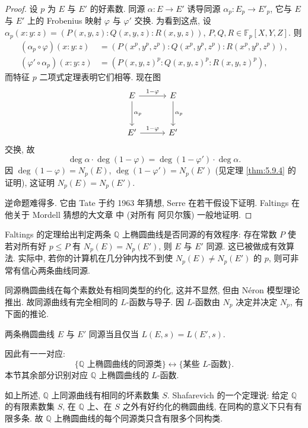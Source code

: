 \begin{proof}
设 $p$ 为 $E$ 与 $E'$ 的好素数. 同源 $\alpha\colon E\to E'$ 诱导同源 $\alpha_p\colon E_p\to E'_p$, 它与 $E$ 与 $E'$ 上的 Frobenius 映射 $\varphi$ 与 $\varphi'$ 交换. 为看到这点, 设 $\alpha_p(x:y:z) = (P(x,y,z):Q(x,y,z):R(x,y,z))$, $P, Q, R\in\mathbb{F}_p[X, Y, Z]$. 则
\begin{align*}
(\alpha_p\circ\varphi)(x:y:z) &= (P(x^p, y^p, z^p):Q(x^p, y^p, z^p):R(x^p, y^p, z^p)),\\
(\varphi'\circ\alpha_p)(x:y:z) &= (P(x,y,z)^p:Q(x,y,z)^p:R(x,y,z)^p),
\end{align*}
而特征 $p$ 二项式定理表明它们相等. 现在图
\[
\begin{tikzcd}[row sep=3em, column sep=3em]
    E \arrow[r, "1-\varphi"] \arrow[d, "\alpha_p"] & E \arrow[d, "\alpha_p"] \\
    E' \arrow[r, "1-\varphi"] & E'
\end{tikzcd}
\]
交换, 故
\[
\deg\alpha\cdot\deg(1-\varphi) = \deg(1-\varphi')\cdot\deg\alpha.
\]
因 $\deg(1-\varphi) = N_p(E)$, $\deg(1-\varphi') = N_p(E')$ (见定理 \ref{thm:5.9.4} 的证明), 这证明 $N_p(E) = N_p(E')$.

逆命题难得多. 它由 Tate 于约 1963 年猜想, Serre 在若干假设下证明. Faltings 在他关于 Mordell 猜想的大文章 \cite{faltings1983} 中 (对所有 阿贝尔簇) 一般地证明.
\end{proof}

Faltings 的定理给出判定两条 $\mathbb{Q}$ 上椭圆曲线是否同源的有效程序: 存在常数 $P$ 使若对所有好 $p\le P$ 有 $N_p(E) = N_p(E')$, 则 $E$ 与 $E'$ 同源. 这已被做成有效算法. 实际中, 若你的计算机在几分钟内找不到使 $N_p(E)\neq N_p(E')$ 的 $p$, 则可非常有信心两条曲线同源.

同源椭圆曲线在每个素数处有相同类型的约化, 这并不显然, 但由 N\'eron 模型理论推出. 故同源曲线有完全相同的 $L$-函数与导子. 因 $L$-函数由 $N_p$ 决定并决定 $N_p$, 有下面的推论.

\begin{corollary} \label{thm:5.4.2} 
两条椭圆曲线 $E$ 与 $E'$ 同源当且仅当 $L(E, s) = L(E', s)$.
\end{corollary}

因此有一一对应:
\[
\{\mathbb{Q} \text{ 上椭圆曲线的同源类}\}\longleftrightarrow\{\text{某些 } L\text{-函数}\}.
\]
本节其余部分识别对应 $\mathbb{Q}$ 上椭圆曲线的 $L$-函数.

如上所述, $\mathbb{Q}$ 上同源曲线有相同的坏素数集 $S$. Shafarevich 的一个定理说: 给定 $\mathbb{Q}$ 的有限素数集 $S$, 在 $\mathbb{Q}$ 上、在 $S$ 之外有好约化的椭圆曲线, 在同构的意义下只有有限多条. 故 $\mathbb{Q}$ 上椭圆曲线的每个同源类只含有限多个同构类.

